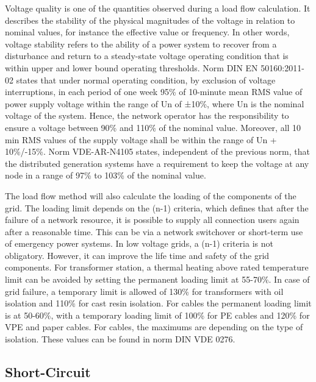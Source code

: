 Voltage quality is one of the quantities observed during a load flow calculation. It describes the stability of the physical magnitudes of the voltage in relation to nominal values, for instance the effective value or frequency. In other words, voltage stability refers to the ability of a power system to recover from a disturbance and return to a steady-state voltage operating condition that is within upper and lower bound operating thresholds. Norm DIN EN 50160:2011-02 states that under normal operating condition, by exclusion of voltage interruptions, in each period of one week 95\% of 10-minute mean RMS value of power supply voltage within the range of Un of ±10\%, where Un is the nominal voltage of the system. Hence, the network operator has the responsibility to ensure a voltage between 90\% and 110\% of the nominal value. Moreover, all 10 min RMS values of the supply voltage shall be within the range of Un + 10\%/-15\%. Norm VDE-AR-N4105 states, independent of the previous norm, that the distributed generation systems have a requirement to keep the voltage at any node in a range of 97\% to 103\% of the nominal value. %

The load flow method will also calculate the loading of the components of the grid. The loading limit depends on the (n-1) criteria, which defines that after the failure of a network resource, it is possible to supply all connection users again after a reasonable time. This can be via a network switchover or short-term use of emergency power systems. In low voltage grids, a (n-1) criteria is not obligatory. However, it can improve the life time and safety of the grid components. For transformer station, a thermal heating above rated temperature limit can be avoided by setting the permanent loading limit at 55-70\%. In case of grid failure, a temporary limit is allowed of 130\% for transformers with oil isolation and 110\% for cast resin isolation. For cables the permanent loading limit is at 50-60\%, with a temporary loading limit of 100\% for PE cables and 120\% for VPE and paper cables. For cables, the maximums are depending on the type of isolation. These values can be found in norm DIN VDE 0276. %


\subsection{Short-Circuit}

